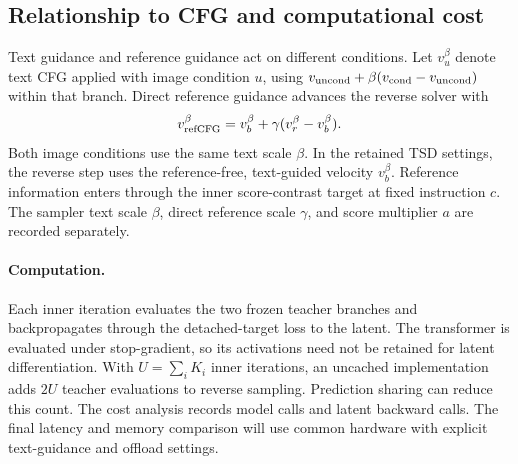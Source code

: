 \subsection{Relationship to CFG and computational cost}
\label{sec:controls}
Text guidance and reference guidance act on different conditions.
Let $v_u^\beta$ denote text CFG applied with image condition $u$, using
$v_{\rm uncond}+\beta(v_{\rm cond}-v_{\rm uncond})$ within that branch.
Direct reference guidance advances the reverse solver with
\begin{equation}
 v_{\rm refCFG}^{\beta}=v_b^{\beta}
       +\gamma(v_r^{\beta}-v_b^{\beta}).
\label{eq:referencecfg}
\end{equation}
Both image conditions use the same text scale $\beta$. In the retained TSD
settings, the reverse step uses the reference-free, text-guided velocity
$v_b^\beta$. Reference information enters through the inner score-contrast
target at fixed instruction $c$. The sampler text scale $\beta$, direct
reference scale $\gamma$, and score multiplier $a$ are recorded separately.

\paragraph{Computation.}
Each inner iteration evaluates the two frozen teacher branches and
backpropagates through the detached-target loss to the latent. The
transformer is evaluated under stop-gradient, so its activations need not
be retained for latent differentiation. With
$U=\sum_i K_i$ inner iterations, an uncached implementation adds $2U$
teacher evaluations to reverse sampling. Prediction sharing can reduce
this count. The cost analysis records model calls and latent backward calls. The final
latency and memory comparison will use common hardware with explicit
text-guidance and offload settings.
